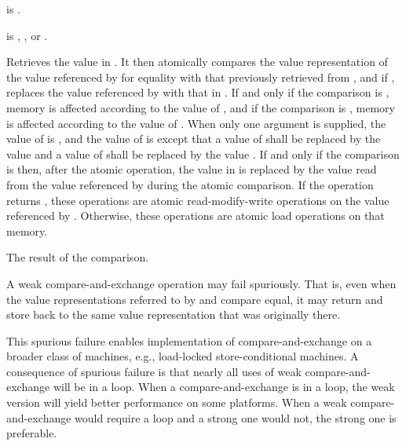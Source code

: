\begin{itemdescr}
\pnum
\constraints
{} is .

\pnum
\expects
{} is
,
, or
.

\pnum
\effects
Retrieves the value in .
It then atomically compares the value representation of
the value referenced by  for equality
with that previously retrieved from ,
and if , replaces the value referenced by 
with that in .
If and only if the comparison is ,
memory is affected according to the value of , and
if the comparison is ,
memory is affected according to the value of .
When only one  argument is supplied,
the value of  is , and
the value of  is 
except that a value of  shall be replaced by
the value  and
a value of  shall be replaced by
the value .
If and only if the comparison is  then,
after the atomic operation,
the value in  is replaced by
the value read from the value referenced by 
during the atomic comparison.
If the operation returns ,
these operations are atomic read-modify-write operations
on the value referenced by .
Otherwise, these operations are atomic load operations on that memory.

\pnum
\returns
The result of the comparison.

\pnum
\remarks
A weak compare-and-exchange operation may fail spuriously.
That is, even when the value representations referred to
by  and  compare equal,
it may return  and
store back to 
the same value representation that was originally there.
\begin{note}
This spurious failure enables implementation of compare-and-exchange
on a broader class of machines, e.g., load-locked store-conditional machines.
A consequence of spurious failure is
that nearly all uses of weak compare-and-exchange will be in a loop.
When a compare-and-exchange is in a loop,
the weak version will yield better performance on some platforms.
When a weak compare-and-exchange would require a loop and
a strong one would not, the strong one is preferable.
\end{note}
\end{itemdescr}

